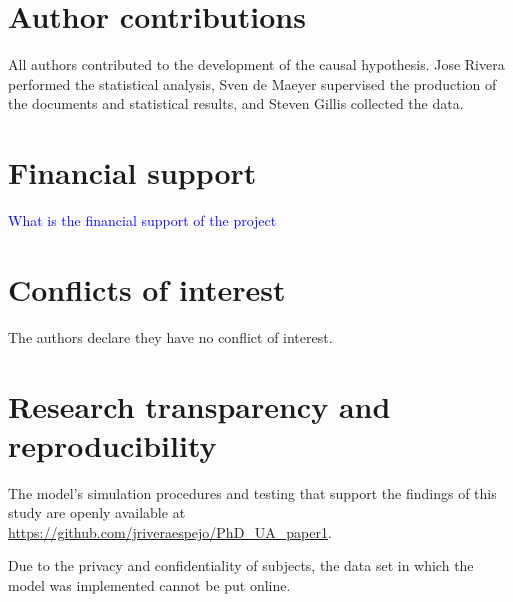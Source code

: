 \section{Author contributions}
All authors contributed to the development of the causal hypothesis. Jose Rivera performed the statistical analysis, Sven de Maeyer supervised the production of the documents and statistical results, and Steven Gillis collected the data.
%
%
\section{Financial support}
\textcolor{blue}{What is the financial support of the project}
%
%
\section{Conflicts of interest}
The authors declare they have no conflict of interest.
%
%
\section{Research transparency and reproducibility}
The model's simulation procedures and testing that support the findings of this study are openly available at \url{https://github.com/jriveraespejo/PhD_UA_paper1}.

Due to the privacy and confidentiality of subjects, the data set in which the model was implemented cannot be put online.
%
%